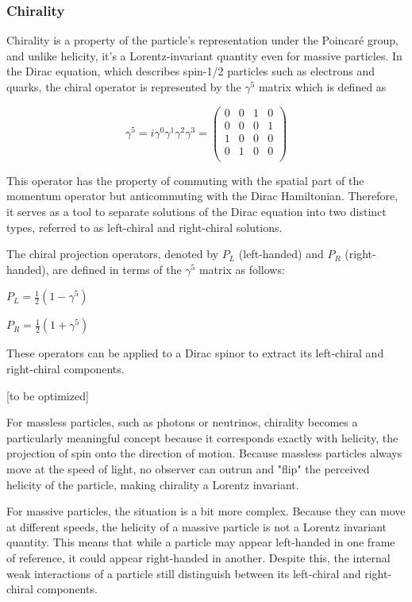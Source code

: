 \subsubsection{Chirality}

Chirality is a property of the particle's representation under the Poincaré group, and unlike helicity, it's a Lorentz-invariant quantity even for massive particles. In the Dirac equation, which describes spin-1/2 particles such as electrons and quarks, the chiral operator is represented by the $\gamma^5$ matrix which is defined as

\begin{equation}
 \gamma^5 = i\gamma^0\gamma^1\gamma^2\gamma^3 = \begin{pmatrix}
    0 & 0 & 1 & 0 \\
    0 & 0 & 0 & 1 \\
    1 & 0 & 0 & 0 \\
    0 & 1 & 0 & 0 \\
\end{pmatrix}   
\end{equation}

This operator has the property of commuting with the spatial part of the momentum operator but anticommuting with the Dirac Hamiltonian. Therefore, it serves as a tool to separate solutions of the Dirac equation into two distinct types, referred to as left-chiral and right-chiral solutions.


The chiral projection operators, denoted by $P_L$ (left-handed) and $P_R$ (right-handed), are defined in terms of the $\gamma^5$ matrix as follows:
\begin{center}
$P_L = \frac{1}{2}(1 - \gamma^5)$

$P_R = \frac{1}{2}(1 + \gamma^5)$    
\end{center}

These operators can be applied to a Dirac spinor to extract its left-chiral and right-chiral components. 

[to be optimized]

For massless particles, such as photons or neutrinos, chirality becomes a particularly meaningful concept because it corresponds exactly with helicity, the projection of spin onto the direction of motion. Because massless particles always move at the speed of light, no observer can outrun and "flip" the perceived helicity of the particle, making chirality a Lorentz invariant.

For massive particles, the situation is a bit more complex. Because they can move at different speeds, the helicity of a massive particle is not a Lorentz invariant quantity. This means that while a particle may appear left-handed in one frame of reference, it could appear right-handed in another. Despite this, the internal weak interactions of a particle still distinguish between its left-chiral and right-chiral components.

